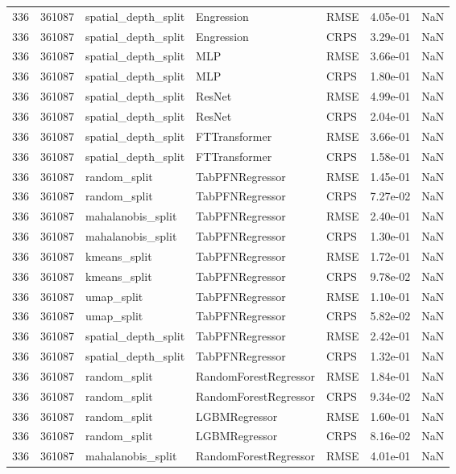 \begin{tabular}{rrlllrr}
336 & 361087 & spatial\_depth\_split & Engression & RMSE & 4.05e-01 & NaN \\
336 & 361087 & spatial\_depth\_split & Engression & CRPS & 3.29e-01 & NaN \\
336 & 361087 & spatial\_depth\_split & MLP & RMSE & 3.66e-01 & NaN \\
336 & 361087 & spatial\_depth\_split & MLP & CRPS & 1.80e-01 & NaN \\
336 & 361087 & spatial\_depth\_split & ResNet & RMSE & 4.99e-01 & NaN \\
336 & 361087 & spatial\_depth\_split & ResNet & CRPS & 2.04e-01 & NaN \\
336 & 361087 & spatial\_depth\_split & FTTransformer & RMSE & 3.66e-01 & NaN \\
336 & 361087 & spatial\_depth\_split & FTTransformer & CRPS & 1.58e-01 & NaN \\
336 & 361087 & random\_split & TabPFNRegressor & RMSE & 1.45e-01 & NaN \\
336 & 361087 & random\_split & TabPFNRegressor & CRPS & 7.27e-02 & NaN \\
336 & 361087 & mahalanobis\_split & TabPFNRegressor & RMSE & 2.40e-01 & NaN \\
336 & 361087 & mahalanobis\_split & TabPFNRegressor & CRPS & 1.30e-01 & NaN \\
336 & 361087 & kmeans\_split & TabPFNRegressor & RMSE & 1.72e-01 & NaN \\
336 & 361087 & kmeans\_split & TabPFNRegressor & CRPS & 9.78e-02 & NaN \\
336 & 361087 & umap\_split & TabPFNRegressor & RMSE & 1.10e-01 & NaN \\
336 & 361087 & umap\_split & TabPFNRegressor & CRPS & 5.82e-02 & NaN \\
336 & 361087 & spatial\_depth\_split & TabPFNRegressor & RMSE & 2.42e-01 & NaN \\
336 & 361087 & spatial\_depth\_split & TabPFNRegressor & CRPS & 1.32e-01 & NaN \\
336 & 361087 & random\_split & RandomForestRegressor & RMSE & 1.84e-01 & NaN \\
336 & 361087 & random\_split & RandomForestRegressor & CRPS & 9.34e-02 & NaN \\
336 & 361087 & random\_split & LGBMRegressor & RMSE & 1.60e-01 & NaN \\
336 & 361087 & random\_split & LGBMRegressor & CRPS & 8.16e-02 & NaN \\
336 & 361087 & mahalanobis\_split & RandomForestRegressor & RMSE & 4.01e-01 & NaN \\

\end{tabular}
